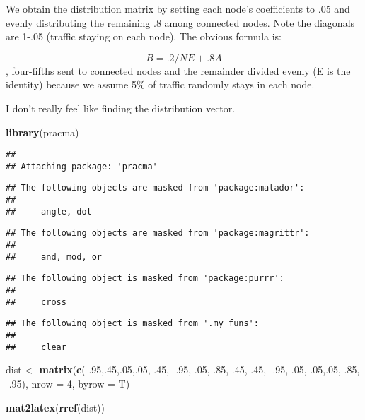 \documentclass[]{article}
\newenvironment{Shaded}{\begin{snugshade}}{\end{snugshade}}
\newcommand{\DataTypeTok}[1]{\textcolor[rgb]{0.00,0.34,0.68}{#1}}
\newcommand{\DecValTok}[1]{\textcolor[rgb]{0.69,0.50,0.00}{#1}}
\newcommand{\FloatTok}[1]{\textcolor[rgb]{0.69,0.50,0.00}{#1}}
\newcommand{\KeywordTok}[1]{\textcolor[rgb]{0.12,0.11,0.11}{\textbf{#1}}}
\newcommand{\NormalTok}[1]{\textcolor[rgb]{0.12,0.11,0.11}{#1}}
\newcommand{\OperatorTok}[1]{\textcolor[rgb]{0.12,0.11,0.11}{#1}}
\newcommand{\StringTok}[1]{\textcolor[rgb]{0.75,0.01,0.01}{#1}}
\begin{document}
We obtain the distribution matrix by setting each node's coefficients to
.05 and evenly distributing the remaining .8 among connected nodes. Note
the diagonals are 1-.05 (traffic staying on each node). The obvious
formula is:

\[
B = .2/NE +.8A
\], four-fifths sent to connected nodes and the remainder divided evenly
(E is the identity) because we assume 5\% of traffic randomly stays in
each node.

I don't really feel like finding the distribution vector.

\begin{Shaded}
\begin{Highlighting}[]
\KeywordTok{library}\NormalTok{(pracma)}
\end{Highlighting}
\end{Shaded}

\begin{verbatim}
## 
## Attaching package: 'pracma'
\end{verbatim}

\begin{verbatim}
## The following objects are masked from 'package:matador':
## 
##     angle, dot
\end{verbatim}

\begin{verbatim}
## The following objects are masked from 'package:magrittr':
## 
##     and, mod, or
\end{verbatim}

\begin{verbatim}
## The following object is masked from 'package:purrr':
## 
##     cross
\end{verbatim}

\begin{verbatim}
## The following object is masked from '.my_funs':
## 
##     clear
\end{verbatim}

\begin{Shaded}
\begin{Highlighting}[]
\NormalTok{dist <-}\StringTok{ }\KeywordTok{matrix}\NormalTok{(}\KeywordTok{c}\NormalTok{(}\OperatorTok{-}\NormalTok{.}\DecValTok{95}\NormalTok{,.}\DecValTok{45}\NormalTok{,.}\DecValTok{05}\NormalTok{,.}\DecValTok{05}\NormalTok{,}
                 \FloatTok{.45}\NormalTok{, }\FloatTok{-.95}\NormalTok{, }\FloatTok{.05}\NormalTok{, }\FloatTok{.85}\NormalTok{,}
                 \FloatTok{.45}\NormalTok{, }\FloatTok{.45}\NormalTok{, }\FloatTok{-.95}\NormalTok{, }\FloatTok{.05}\NormalTok{,}
                 \FloatTok{.05}\NormalTok{,.}\DecValTok{05}\NormalTok{, }\FloatTok{.85}\NormalTok{, }\FloatTok{-.95}\NormalTok{), }\DataTypeTok{nrow =} \DecValTok{4}\NormalTok{, }\DataTypeTok{byrow =}\NormalTok{ T)}

\KeywordTok{mat2latex}\NormalTok{(}\KeywordTok{rref}\NormalTok{(dist))}
\end{Highlighting}
\end{Shaded}
\end{document}
